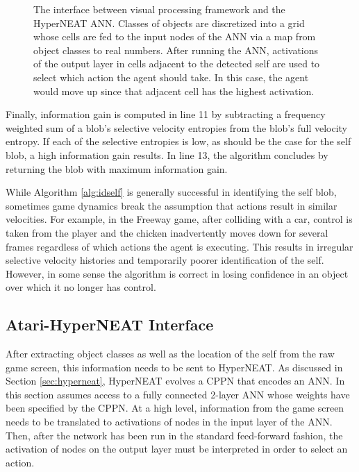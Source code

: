 \documentclass{acm_proc_article-sp}
\begin{document}
\begin{figure}
 \caption{The interface between visual processing framework and the HyperNEAT ANN. Classes of objects are discretized into a grid whose cells are fed to the input nodes of the ANN via a map from object classes to real numbers. After running the ANN, activations of the output layer in cells adjacent to the detected self are used to select which action the agent should take. In this case, the agent would move up since that adjacent cell has the highest activation.}
 \label{fig:interface}
\end{figure}

Finally, information gain is computed in line 11 by subtracting a frequency weighted sum of a blob's selective velocity entropies from the blob's full velocity entropy. If each of the selective entropies is low, as should be the case for the self blob, a high information gain results. In line 13, the algorithm concludes by returning the blob with maximum information gain.

While Algorithm \ref{alg:idself} is generally successful in identifying the self blob, sometimes game dynamics break the assumption that actions result in similar velocities. For example, in the Freeway game, after colliding with a car, control is taken from the player and the chicken inadvertently moves down for several frames regardless of which actions the agent is executing. This results in irregular selective velocity histories and temporarily poorer identification of the self. However, in some sense the algorithm is correct in losing confidence in an object over which it no longer has control.

\subsection{Atari-HyperNEAT Interface}
\label{sec:interface}
After extracting object classes as well as the location of the self from the raw game screen, this information needs to be sent to HyperNEAT. As discussed in Section \ref{sec:hyperneat}, HyperNEAT evolves a CPPN that encodes an ANN. In this section assumes access to a fully connected 2-layer ANN whose weights have been specified by the CPPN. At a high level, information from the game screen needs to be translated to activations of nodes in the input layer of the ANN. Then, after the network has been run in the standard feed-forward fashion, the activation of nodes on the output layer must be interpreted in order to select an action.
\end{document}
